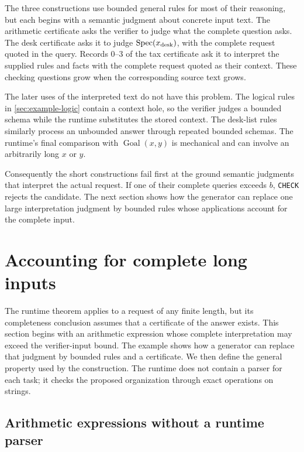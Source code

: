 \documentclass[11pt,twoside]{article}
\theoremstyle{definition}
\newcommand{\Goal}{\operatorname{Goal}}
\begin{document}
The three constructions use bounded general rules for most of their
reasoning, but each begins with a semantic judgment about concrete input text.
The arithmetic certificate asks the verifier to judge what the complete
question asks. The desk certificate asks it to judge
$\mathrm{Spec}(x_{\rm desk})$, with the complete request quoted in the query.
Records 0--3 of the tax certificate ask it to interpret the supplied rules and
facts with the complete request quoted as their context. These checking
questions grow when the corresponding source text grows.

The later uses of the interpreted text do not have this problem. The logical
rules in \cref{sec:example-logic} contain a context hole, so the verifier
judges a bounded schema while the runtime substitutes the stored context. The
desk-list rules similarly process an unbounded answer through repeated bounded
schemas. The runtime's final comparison with $\Goal(x,y)$ is mechanical and
can involve an arbitrarily long $x$ or $y$.

Consequently the short constructions fail first at the ground semantic
judgments that interpret the actual request. If one of their complete queries
exceeds $b$, \texttt{CHECK} rejects the candidate. The next section shows how
the generator can replace one large interpretation judgment by bounded rules
whose applications account for the complete input.

\section{Accounting for complete long inputs}
\label{sec:compositional-inputs}

The runtime theorem applies to a request of any finite length, but its
completeness conclusion assumes that a certificate of the answer exists.
This section begins with an arithmetic expression whose complete
interpretation may exceed the verifier-input bound. The example shows how a
generator can replace that judgment by bounded rules and a certificate. We
then define the general property used by the construction. The runtime does
not contain a parser for each task; it checks the proposed organization through
exact operations on strings.

\subsection{Arithmetic expressions without a runtime parser}
\label{sec:long-arithmetic-expression}
\end{document}

